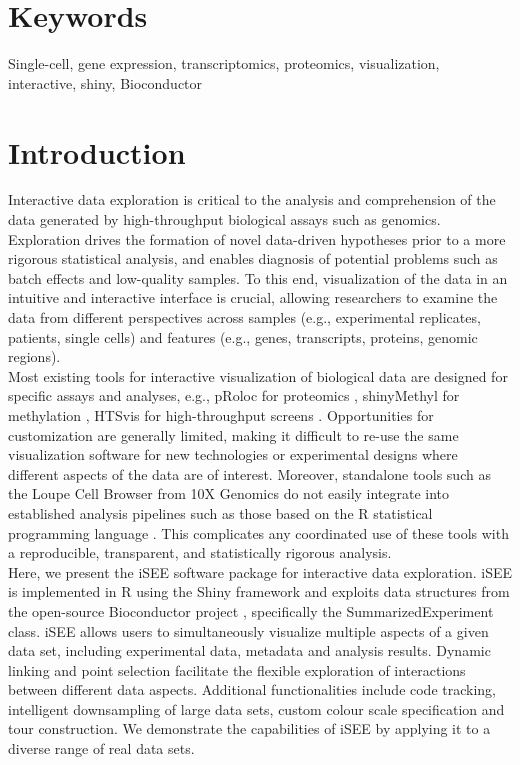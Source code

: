 \documentclass[10pt,a4paper,twocolumn]{article}
\begin{document}
\section*{Keywords}


Single-cell, gene expression, transcriptomics, proteomics, visualization, interactive, shiny, Bioconductor


\clearpage

\section*{Introduction}
Interactive data exploration is critical to the analysis and comprehension of the data generated by high-throughput biological assays such as genomics.
Exploration drives the formation of novel data-driven hypotheses prior to a more rigorous statistical analysis, and enables diagnosis of potential problems such as batch effects and low-quality samples.
To this end, visualization of the data in an intuitive and interactive interface is crucial, allowing researchers to examine the data from different perspectives across samples (e.g., experimental replicates, patients, single cells) and features (e.g., genes, transcripts, proteins, genomic regions).\\

Most existing tools for interactive visualization of biological data are designed for specific assays and analyses, e.g., pRoloc for proteomics \citep{gatto2014mass}, shinyMethyl for methylation \citep{fortin2014shinymethyl}, HTSvis for high-throughput screens \citep{scheeder2017htsvis}.
Opportunities for customization are generally limited, making it difficult to re-use the same visualization software for new technologies or experimental designs where different aspects of the data are of interest.
Moreover, standalone tools such as the Loupe Cell Browser from 10X Genomics \citep{zheng2017massively} do not easily integrate into established analysis pipelines such as those based on the R statistical programming language \citep{rcore2008R}.
This complicates any coordinated use of these tools with a reproducible, transparent, and statistically rigorous analysis.\\

Here, we present the iSEE software package for interactive data exploration.
iSEE is implemented in R using the Shiny framework \citep{chang2017shiny} and exploits data structures from the open-source Bioconductor project \citep{gentleman2004bioconductor}, specifically the SummarizedExperiment class.
iSEE allows users to simultaneously visualize multiple aspects of a given data set, including experimental data, metadata and analysis results.
Dynamic linking and point selection facilitate the flexible exploration of interactions between different data aspects.
Additional functionalities include code tracking, intelligent downsampling of large data sets, custom colour scale specification and tour construction.
We demonstrate the capabilities of iSEE by applying it to a diverse range of real data sets.
\end{document}
